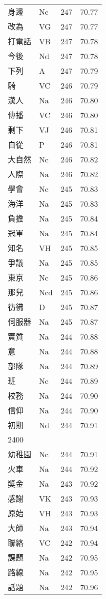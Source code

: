 \documentclass[twocolumn]{book}
\begin{document}
\begin{supertabular}{llrr}
身邊 & Nc & 247 &  70.77\\
改為 & VG & 247 &  70.77\\
打電話 & VB & 247 &  70.78\\
今後 & Nd & 247 &  70.78\\
下列 & A & 247 &  70.79\\
騎 & VC & 246 &  70.79\\
漢人 & Na & 246 &  70.80\\
傳播 & VC & 246 &  70.80\\
剩下 & VJ & 246 &  70.81\\
自從 & P & 246 &  70.81\\
大自然 & Nc & 246 &  70.82\\
人際 & Na & 246 &  70.82\\
學會 & Nc & 245 &  70.83\\
海洋 & Na & 245 &  70.83\\
負擔 & Na & 245 &  70.84\\
冠軍 & Na & 245 &  70.84\\
知名 & VH & 245 &  70.85\\
爭議 & Na & 245 &  70.85\\
東京 & Nc & 245 &  70.86\\
那兒 & Ncd & 245 &  70.86\\
彷彿 & D & 245 &  70.87\\
伺服器 & Na & 245 &  70.87\\
實質 & Na & 244 &  70.88\\
意 & Na & 244 &  70.88\\
部隊 & Na & 244 &  70.89\\
班 & Nc & 244 &  70.89\\
校務 & Na & 244 &  70.90\\
信仰 & Na & 244 &  70.90\\
初期 & Nd & 244 &  70.91\\
2400\\
幼稚園 & Nc & 244 &  70.91\\
火車 & Na & 244 &  70.92\\
獎金 & Na & 243 &  70.92\\
感謝 & VK & 243 &  70.93\\
原始 & VH & 243 &  70.93\\
大師 & Na & 243 &  70.94\\
聯絡 & VC & 242 &  70.94\\
課題 & Na & 242 &  70.95\\
路線 & Na & 242 &  70.95\\
話題 & Na & 242 &  70.96\\

\end{supertabular}
\end{document}
